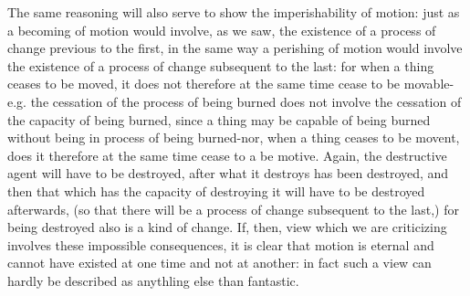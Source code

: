 The same reasoning will also serve to show the imperishability of
motion: just as a becoming of motion would involve, as we saw, the
existence of a process of change previous to the first, in the same
way a perishing of motion would involve the existence of a process
of change subsequent to the last: for when a thing ceases to be moved,
it does not therefore at the same time cease to be movable-e.g. the
cessation of the process of being burned does not involve the cessation
of the capacity of being burned, since a thing may be capable of being
burned without being in process of being burned-nor, when a thing
ceases to be movent, does it therefore at the same time cease to a
be motive. Again, the destructive agent will have to be destroyed,
after what it destroys has been destroyed, and then that which has
the capacity of destroying it will have to be destroyed afterwards,
(so that there will be a process of change subsequent to the last,)
for being destroyed also is a kind of change. If, then, view which
we are criticizing involves these impossible consequences, it is clear
that motion is eternal and cannot have existed at one time and not
at another: in fact such a view can hardly be described as anythling
else than fantastic. 

